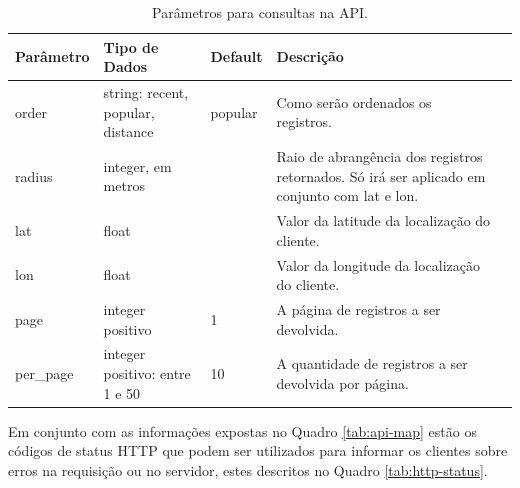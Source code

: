 \documentclass[diss]{template/setrem}
\begin{document}
\begin{table}
  \begin{center}
  	\footnotesize
  	\renewcommand{\arraystretch}{1.5}
  	\newlength{\apiparamswidth}
	\setlength{\apiparamswidth}{6cm}  	
	
    \begin{tabular}{| l | l | l | l | l |}
    \hline
	
	\textbf{Parâmetro} & \textbf{Tipo de Dados} & \textbf{Default} & \textbf{Descrição} \\ \hline
	order & string: recent, popular, distance & popular & \parbox[t]{\apiparamswidth}{Como serão ordenados os registros.} \\ \hline
	radius & integer, em metros & & \parbox[t]{\apiparamswidth}{Raio de abrangência dos registros retornados. Só irá ser aplicado em conjunto com lat e lon.} \\ \hline
	lat & float & & \parbox[t]{\apiparamswidth}{Valor da latitude da localização do cliente.} \\ \hline
	lon & float & & \parbox[t]{\apiparamswidth}{Valor da longitude da localização do cliente.} \\ \hline
	page & integer positivo & 1 & \parbox[t]{\apiparamswidth}{A página de registros a ser devolvida.} \\ \hline
	per\_page & integer positivo: entre 1 e 50 & 10 & \parbox[t]{\apiparamswidth}{A quantidade de registros a ser devolvida por página.} \\ \hline
	
    \hline
    \end{tabular}
  \end{center}
  
  \caption{Parâmetros para consultas na API.}
  \label{tab:api-params}
\end{table}

Em conjunto com as informações expostas no Quadro \ref{tab:api-map} estão os códigos de status HTTP que podem ser utilizados para informar os clientes sobre erros na requisição ou no servidor, estes descritos no Quadro \ref{tab:http-status}.
\end{document}
